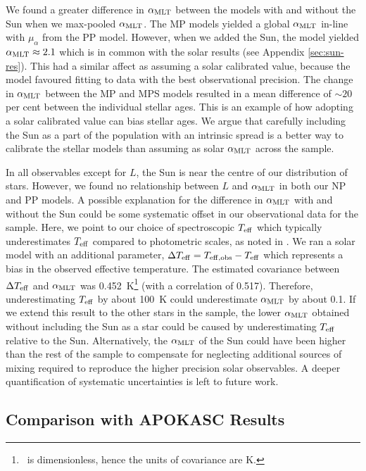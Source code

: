 We found a greater difference in ${\alpha_\mathrm{MLT}}$ between the models with and without the Sun when we max-pooled ${\alpha_\mathrm{MLT}}$. The MP models yielded a global ${\alpha_\mathrm{MLT}}$ in-line with $\mu_\alpha$ from the PP model. However, when we added the Sun, the model yielded ${\alpha_\mathrm{MLT}} \approx 2.1$ which is in common with the solar results (see Appendix \ref{sec:sun-res}). This had a similar affect as assuming a solar calibrated value, because the model favoured fitting to data with the best observational precision. The change in ${\alpha_\mathrm{MLT}}$ between the MP and MPS models resulted in a mean difference of $\sim 20$ per cent between the individual stellar ages. This is an example of how adopting a solar calibrated value can bias stellar ages. We argue that carefully including the Sun as a part of the population with an intrinsic spread is a better way to calibrate the stellar models than assuming as solar ${\alpha_\mathrm{MLT}}$ across the sample.

In all observables except for $L$, the Sun is near the centre of our distribution of stars. However, we found no relationship between $L$ and ${\alpha_\mathrm{MLT}}$ in both our NP and PP models. A possible explanation for the difference in ${\alpha_\mathrm{MLT}}$ with and without the Sun could be some systematic offset in our observational data for the sample. Here, we point to our choice of spectroscopic ${T_\mathrm{eff}}$ which typically underestimates ${T_\mathrm{eff}}$ compared to photometric scales, as noted in . We ran a solar model with an additional parameter, $\Delta {T_\mathrm{eff}} = T_{\rm eff, obs} - {T_\mathrm{eff}}$ which represents a bias in the observed effective temperature. The estimated covariance between $\Delta {T_\mathrm{eff}}$ and ${\alpha_\mathrm{MLT}}$ was \SI{0.452}{\kelvin}\footnote{\mlt~is dimensionless, hence the units of covariance are \si{\kelvin}.} (with a correlation of \num{0.517}). Therefore, underestimating ${T_\mathrm{eff}}$ by about \SI{100}{\kelvin} could underestimate ${\alpha_\mathrm{MLT}}$ by about \num{0.1}. If we extend this result to the other stars in the sample, the lower ${\alpha_\mathrm{MLT}}$ obtained without including the Sun as a star could be caused by underestimating ${T_\mathrm{eff}}$ relative to the Sun. Alternatively, the ${\alpha_\mathrm{MLT}}$ of the Sun could have been higher than the rest of the sample to compensate for neglecting additional sources of mixing required to reproduce the higher precision solar observables. A deeper quantification of systematic uncertainties is left to future work.

\subsection{Comparison with APOKASC Results}\label{sec:comp}

